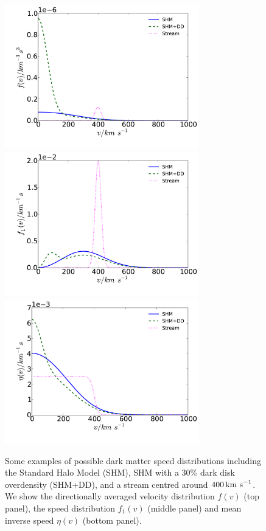 \begin{figure}[h]
  \centering
  \includegraphics[width=0.75\textwidth]{DirectDetection/f.pdf}
  \includegraphics[width=0.75\textwidth]{DirectDetection/f1.pdf}
  \includegraphics[width=0.75\textwidth]{DirectDetection/eta.pdf}
  \caption[Examples of dark matter speed distributions]{Some examples of possible dark matter speed distributions including the Standard Halo Model (SHM), SHM with a 30\% dark disk overdensity (SHM+DD), and a stream centred around $400 \,\textrm{km s}^{-1}$. We show the directionally averaged velocity distribution $f(v)$ (top panel), the speed distribution $f_1(v)$ (middle panel) and mean inverse speed $\eta(v)$ (bottom panel). }
  \label{fig:DD:SpeedDists}
\end{figure}

